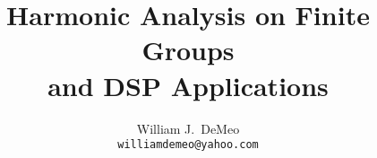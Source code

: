 \documentclass[10pt, twocolumn, twoside]{IEEEtran}
\title{Harmonic Analysis on Finite Groups \\ and DSP Applications}
\author{William J.~DeMeo\\ 
{\small \tt williamdemeo@yahoo.com}}
\begin{document}
  \maketitle

\begin{abstract}

%

%

\verb!!

\end{abstract}

%

%

\verb!!


%
%
%

\verb!!


%
%
%

\verb!!


%
%
%

\verb!!


\verb!!

\end{document}
